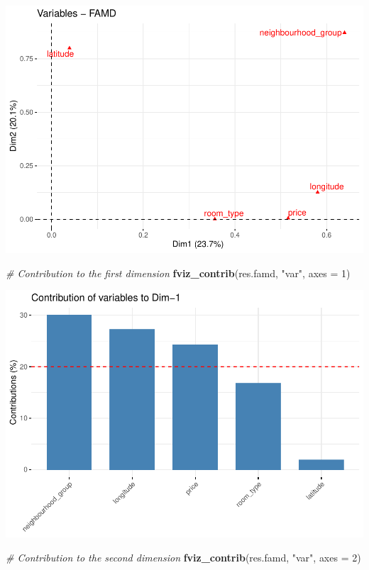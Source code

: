 \documentclass[
]{article}
\newenvironment{Shaded}{\begin{snugshade}}{\end{snugshade}}
\newcommand{\CommentTok}[1]{\textcolor[rgb]{0.56,0.35,0.01}{\textit{#1}}}
\newcommand{\DataTypeTok}[1]{\textcolor[rgb]{0.13,0.29,0.53}{#1}}
\newcommand{\DecValTok}[1]{\textcolor[rgb]{0.00,0.00,0.81}{#1}}
\newcommand{\KeywordTok}[1]{\textcolor[rgb]{0.13,0.29,0.53}{\textbf{#1}}}
\newcommand{\NormalTok}[1]{#1}
\newcommand{\StringTok}[1]{\textcolor[rgb]{0.31,0.60,0.02}{#1}}
\begin{document}
\includegraphics{project-code_files/figure-latex/unnamed-chunk-39-1.pdf}

\begin{Shaded}
\begin{Highlighting}[]
\CommentTok{# Contribution to the first dimension}
\KeywordTok{fviz_contrib}\NormalTok{(res.famd, }\StringTok{"var"}\NormalTok{, }\DataTypeTok{axes =} \DecValTok{1}\NormalTok{)}
\end{Highlighting}
\end{Shaded}

\includegraphics{project-code_files/figure-latex/unnamed-chunk-39-2.pdf}

\begin{Shaded}
\begin{Highlighting}[]
\CommentTok{# Contribution to the second dimension}
\KeywordTok{fviz_contrib}\NormalTok{(res.famd, }\StringTok{"var"}\NormalTok{, }\DataTypeTok{axes =} \DecValTok{2}\NormalTok{)}
\end{Highlighting}
\end{Shaded}
\end{document}
